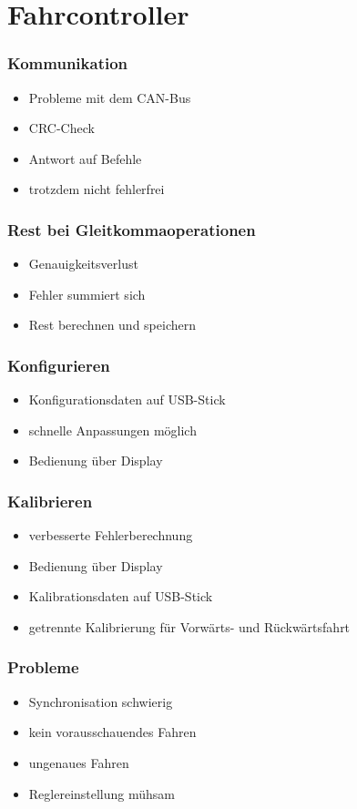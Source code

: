 \section{Fahrcontroller}
\begin{frame}
	\frametitle{Kommunikation}
	\begin{itemize}
		\item Probleme mit dem CAN-Bus
		\item CRC-Check
		\item Antwort auf Befehle
		\item trotzdem nicht fehlerfrei
	\end{itemize}
	\end{frame}

\begin{frame}
	\frametitle{Rest bei Gleitkommaoperationen}
	\begin{itemize}
		\item Genauigkeitsverlust
		\item Fehler summiert sich
		\item Rest berechnen und speichern
	\end{itemize}
\end{frame}

\begin{frame}
	\frametitle{Konfigurieren}
	\begin{itemize}
		\item Konfigurationsdaten auf USB-Stick
		\item schnelle Anpassungen möglich
		\item Bedienung über Display
	\end{itemize}
\end{frame}

\begin{frame}
	\frametitle{Kalibrieren}
	\begin{itemize}
		\item verbesserte Fehlerberechnung
		\item Bedienung über Display
		\item Kalibrationsdaten auf USB-Stick
		\item getrennte Kalibrierung für Vorwärts- und Rückwärtsfahrt
	\end{itemize}
\end{frame}

\begin{frame}
	\frametitle{Probleme}
	\begin{itemize}
		\item Synchronisation schwierig
		\item kein vorausschauendes Fahren
		\item ungenaues Fahren
		\item Reglereinstellung mühsam
	\end{itemize}
\end{frame}
